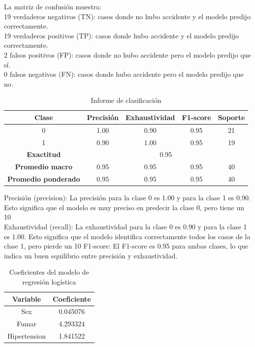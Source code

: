 \documentclass[a4paper, 12pt]{article}
\begin{document}
La matriz de confusión muestra:
\\
19 verdaderos negativos (TN): casos donde no hubo accidente y el modelo predijo correctamente.
\\
19 verdaderos positivos (TP): casos donde hubo accidente y el modelo predijo correctamente.
\\
2 falsos positivos (FP): casos donde no hubo accidente pero el modelo predijo que sí.
\\
0 falsos negativos (FN): casos donde hubo accidente pero el modelo predijo que no.

\begin{table}[H]
    \centering
    \begin{tabular}{|c|c|c|c|c|}
        \hline
        Clase & Precisión & Exhaustividad & F1-score & Soporte \\ \hline
        0 & 1.00 & 0.90 & 0.95 & 21 \\ \hline
        1 & 0.90 & 1.00 & 0.95 & 19 \\ \hline
        \textbf{Exactitud} & \multicolumn{4}{c|}{0.95} \\ \hline
        \textbf{Promedio macro} & 0.95 & 0.95 & 0.95 & 40 \\ \hline
        \textbf{Promedio ponderado} & 0.95 & 0.95 & 0.95 & 40 \\ \hline
    \end{tabular}
    \caption{Informe de clasificación}
    \label{tab:classification_report}
\end{table}


Precisión (precision): La precisión para la clase 0 es 1.00 y para la clase 1 es 0.90. Esto significa que el modelo es muy preciso en predecir la clase 0, pero tiene un 10%
\\
Exhaustividad (recall): La exhaustividad para la clase 0 es 0.90 y para la clase 1 es 1.00. Esto significa que el modelo identifica correctamente todos los casos de la clase 1, pero pierde un 10%
F1-score: El F1-score es 0.95 para ambas clases, lo que indica un buen equilibrio entre precisión y exhaustividad.

\begin{table}[H]
    \centering
    \begin{tabular}{|c|c|}
        \hline
        Variable & Coeficiente \\ \hline
        Sex & 0.045076 \\ \hline
        Fumar & 4.293324 \\ \hline
        Hipertension & 1.841522 \\ \hline
    \end{tabular}
    \caption{Coeficientes del modelo de regresión logística}
    \label{tab:coeficientes_modelo}
\end{table}
\end{document}
